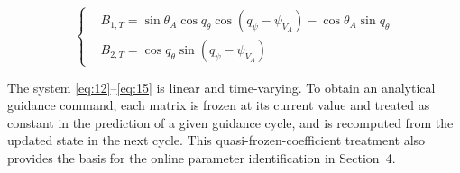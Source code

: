 \begin{equation}
\label{eq:15}
\left\{
\begin{aligned}
& {B_{1,T}} = \sin {\theta _A}\cos {q_\theta }\cos \left( {{q_\psi } - {\psi _{{V_A}}}} \right) - \cos {\theta _A}\sin {q_\theta } \\
& {B_{2,T}} = \cos {q_\theta }\sin \left( {{q_\psi } - {\psi _{{V_A}}}} \right)
\end{aligned}
\right.
\end{equation}
\begin{remark}
The system \eqref{eq:12}--\eqref{eq:15} is linear and time-varying. To obtain an analytical guidance command, each matrix is frozen at its current value and treated as constant in the prediction of a given guidance cycle, and is recomputed from the updated state in the next cycle. This quasi-frozen-coefficient treatment also provides the basis for the online parameter identification in Section~4.
\end{remark}

